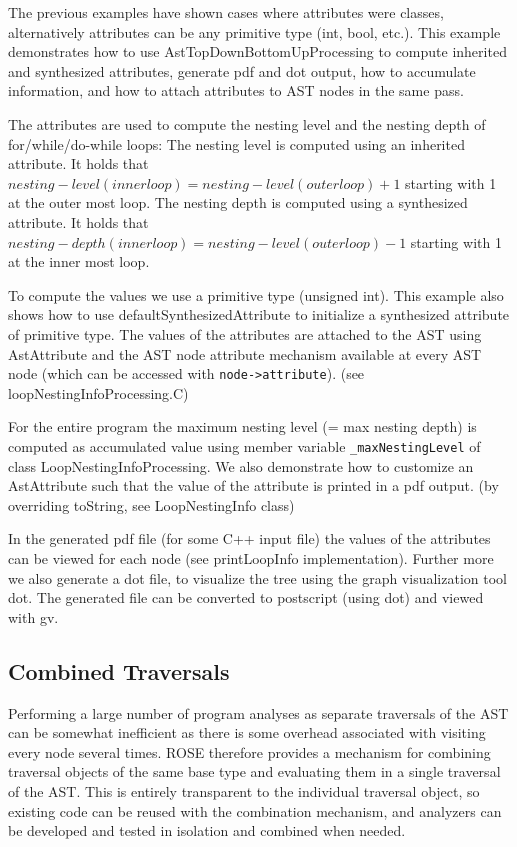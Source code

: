 The previous examples have shown cases where attributes were classes,
alternatively attributes can be any primitive type (int, bool,
etc.). This example demonstrates how to use
AstTopDownBottomUpProcessing to compute inherited and synthesized
attributes, generate pdf and dot output, how to accumulate
information, and how to attach attributes to AST nodes in the same
pass.

The attributes are used to compute the nesting level and the nesting
depth of for/while/do-while loops: The nesting level is computed using
an inherited attribute. It holds that $nesting-level(innerloop) =
nesting-level(outerloop) + 1$ starting with 1 at the outer most loop.
The nesting depth is computed using a synthesized attribute. It holds
that $nesting-depth(innerloop) = nesting-level(outerloop) - 1$
starting with 1 at the inner most loop.

To compute the values we use a primitive type (unsigned int). This
example also shows how to use defaultSynthesizedAttribute to
initialize a synthesized attribute of primitive type. The values of
the attributes are attached to the AST using AstAttribute and the AST
node attribute mechanism available at every AST node (which can be
accessed with \verb+node->attribute+).  (see
loopNestingInfoProcessing.C)

For the entire program the maximum nesting level (= max nesting depth)
is computed as accumulated value using member variable
\verb+_maxNestingLevel+ of class LoopNestingInfoProcessing. We also
demonstrate how to customize an AstAttribute such that the value of
the attribute is printed in a pdf output.  (by overriding toString,
see LoopNestingInfo class)

In the generated pdf file (for some C++ input file) the values of the
attributes can be viewed for each node (see printLoopInfo
implementation). Further more we also generate a dot file, to
visualize the tree using the graph visualization tool dot. The
generated file can be converted to postscript (using dot) and viewed
with gv.

\subsection{Combined Traversals}

Performing a large number of program analyses as separate traversals of the
AST can be somewhat inefficient as there is some overhead associated with
visiting every node several times. ROSE therefore provides a mechanism for
combining traversal objects of the same base type and evaluating them in a
single traversal of the AST. This is entirely transparent to the individual
traversal object, so existing code can be reused with the combination
mechanism, and analyzers can be developed and tested in isolation and combined
when needed.

